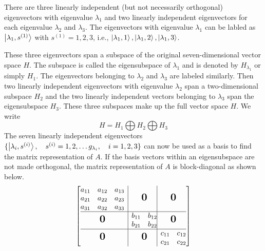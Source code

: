 	There are three linearly independent (but not necessarily orthogonal) eigenvectors with eigenvalue $\lambda_1$ and two linearly independent eigenvectors for each eigenvalue $\lambda_2$ and $\lambda_3$. The eigenvectors with eigenvalue $\lambda_1$ can be labled as 
	$\ket{\lambda_1, s^{(1)}}$ with $s^{(1)} = 1,2,3$, i.e., $\ket{\lambda_1,1}, \ket{\lambda_1,2}, \ket{\lambda_1,3}$.
	
	These three eigenvectors span a subspace of the original seven-dimensional vector space $H$. The subspace is called the eigensubspace of $\lambda_1$ and is denoted by $H_{\lambda_1}$ or simply $H_1$. The eigenvectors belonging to $\lambda_2$ and $\lambda_3$ are labeled similarly. Then two linearly independent eigenvectors with eigenvalue $\lambda_2$ span a two-dimensional subspace $H_2$ and the two linearly independent vectors belonging to $\lambda_3$ span the eigensubspace $H_3$. These three subspaces make up the full vector space $H$. We write
	\begin{equation}
		H = H_1 \bigoplus H_2 \bigoplus H_3
	\end{equation}
	The seven linearly independent eigenvectors $\{\ket{\lambda_i, s^{(i)}}, \quad s^{(i)}=1,2,\ldots g_{\lambda_i}, \quad i=1,2,3 \}$
	can now be used as a basis to find the matrix representation of $A$. If the basis vectors within an eigensubspace are not made orthogonal, the matrix representation of $A$ is block-diagonal as shown below.
	\begin{equation}
		\left[\begin{array}{@{}c|c@{}|c@{}}
		\begin{matrix}
		a_{11} & a_{12} & a_{13} \\
		a_{21} & a_{22} & a_{23} \\
		a_{31} & a_{32} & a_{33}
		\end{matrix}
		& \bigzero & \bigzero\\
		\hline
		\bigzero &
		\begin{matrix}
		b_{11} & b_{12} \\
		b_{21} & b_{22}
		\end{matrix}
		& \bigzero \\
		\hline
		\bigzero & \bigzero &
		\begin{matrix}
		c_{11} & c_{12} \\
		c_{21} & c_{22}
		\end{matrix}
		\end{array}\right]
	\end{equation}
	
